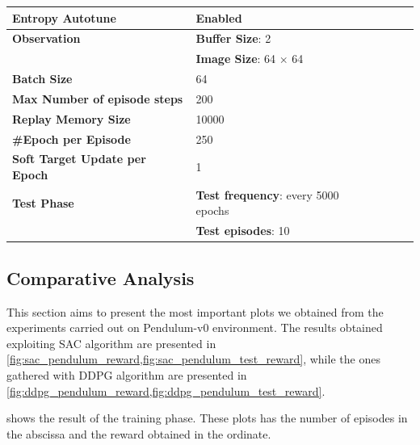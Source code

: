 \begin{table}[!h]
{\begin{tabular}{@{}lllll@{}}
			\textbf{Entropy Autotune}             & Enabled                                                \\\midrule
			\textbf{Observation}                  & \textbf{Buffer Size}: 2                                \\
			                                      & \textbf{Image Size}: 64 $\times$ 64                    \\\midrule
			\textbf{Batch Size}                   & 64                                                     \\\midrule
			\textbf{Max Number of episode steps}  & 200                                                    \\\midrule
			\textbf{Replay Memory Size}           & 10000                                                  \\\midrule

			\textbf{\#Epoch per Episode}          & 250                                                    \\\midrule
			\textbf{Soft Target Update per Epoch} & 1                                                      \\\midrule
			\textbf{Test Phase}                   & \textbf{Test frequency}: every 5000 epochs             \\
			                                      & \textbf{Test episodes}: 10                             \\
			\bottomrule
		\end{tabular}}
\end{table}

\FloatBarrier

\subsection{Comparative Analysis}

This section aims to present the most important plots we obtained from the experiments carried out on Pendulum-v0 environment.
The results obtained exploiting SAC algorithm are presented in \vref{fig:sac_pendulum_reward,fig:sac_pendulum_test_reward}, while the ones gathered with DDPG algorithm are presented in \vref{fig:ddpg_pendulum_reward,fig:ddpg_pendulum_test_reward}.

 shows the result of the training phase.
These plots has the number of episodes in the abscissa and the reward obtained in the ordinate.

